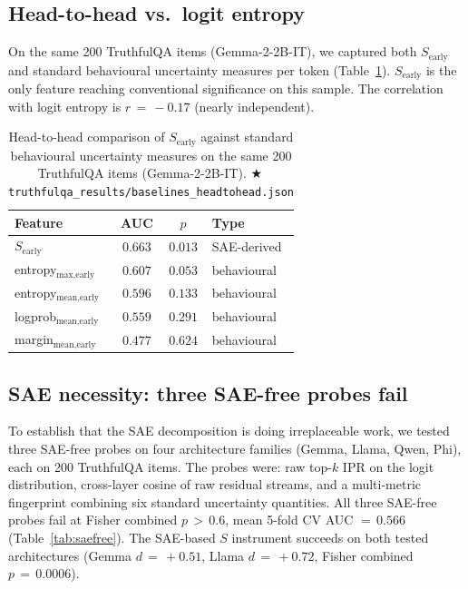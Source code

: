 \documentclass[11pt,letterpaper]{article}
\newcommand{\repro}[1]{%
  \textcolor{fathomgreen}{\footnotesize$\bigstar$\,\texttt{#1}}}
\begin{document}
\subsection{Head-to-head vs.\ logit entropy}

On the same 200 TruthfulQA items (Gemma-2-2B-IT), we captured both
$S_{\text{early}}$ and standard behavioural uncertainty measures per
token (Table~\ref{tab:headtohead}). $S_{\text{early}}$ is the only
feature reaching conventional significance on this sample. The correlation
with logit entropy is $r\,=\,-0.17$ (nearly independent).

\begin{table}[h]
\centering
\small
\begin{tabular}{lccl}
\toprule
Feature & AUC & $p$ & Type \\
\midrule
$S_{\text{early}}$              & $\mathbf{0.663}$ & $\mathbf{0.013}$ & SAE-derived \\
entropy$_{\text{max,early}}$    & $0.607$ & $0.053$ & behavioural \\
entropy$_{\text{mean,early}}$   & $0.596$ & $0.133$ & behavioural \\
logprob$_{\text{mean,early}}$   & $0.559$ & $0.291$ & behavioural \\
margin$_{\text{mean,early}}$    & $0.477$ & $0.624$ & behavioural \\
\bottomrule
\end{tabular}
\caption{Head-to-head comparison of $S_{\text{early}}$ against standard
behavioural uncertainty measures on the same 200 TruthfulQA items
(Gemma-2-2B-IT).
\repro{truthfulqa\_results/baselines\_headtohead.json}}
\label{tab:headtohead}
\end{table}

\subsection{SAE necessity: three SAE-free probes fail}

To establish that the SAE decomposition is doing irreplaceable work, we
tested three SAE-free probes on four architecture families (Gemma, Llama,
Qwen, Phi), each on 200 TruthfulQA items. The probes were: raw top-$k$
IPR on the logit distribution, cross-layer cosine of raw residual streams,
and a multi-metric fingerprint combining six standard uncertainty
quantities. All three SAE-free probes fail at Fisher combined
$p\,>\,0.6$, mean 5-fold CV AUC $=\,0.566$ (Table~\ref{tab:saefree}).
The SAE-based $S$ instrument succeeds on both tested architectures
(Gemma $d\,=\,+0.51$, Llama $d\,=\,+0.72$, Fisher combined
$p\,=\,0.0006$).
\end{document}
